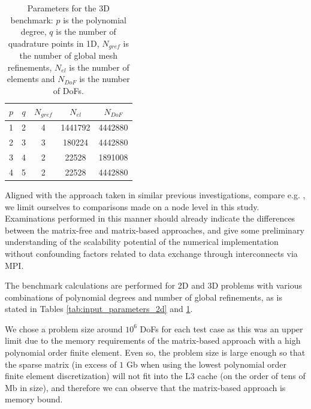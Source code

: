 \documentclass[times,doublespace]{nmeauth}
\newcommand{\changeDD}[1]{#1}
\newcommand{\changeJP}[1]{#1}
\begin{document}
\begin{table}
  \centering
  \begin{tabular}{ccccc}
  \hline
    $p$ & $q$ & $N_{gref}$ & $N_{el}$ & $N_{DoF}$ \\
  \hline
    1 & 2 & 4 & 1441792 & 4442880 \\
    2 & 3 & 3 & 180224 & 4442880 \\
    3 & 4 & 2 & 22528 & 1891008 \\
    4 & 5 & 2 & 22528 & 4442880 \\
  \hline
  \end{tabular}
  \caption{Parameters for the 3D benchmark: $p$ is the polynomial degree,
  $q$ is the number of quadrature points in 1D, $N_{gref}$ is the number of global mesh refinements, $N_{el}$ is the number of elements and $N_{DoF}$ is the number of DoFs.
  }
  \label{tab:input_parameters_3d}
\end{table}

\changeJP{%
Aligned with the approach taken in similar previous investigations, compare e.g. \cite{kronbichler2017fast},
we limit ourselves to comparisons made on a node level in this study.
Examinations performed in this manner should already indicate the differences between the matrix-free and matrix-based approaches, and give some preliminary understanding of the scalability potential of the numerical implementation without confounding factors related to data exchange through interconnects via MPI.
}
The benchmark calculations are performed for 2D and 3D problems with various combinations of polynomial degrees and number of global refinements, as is stated in Tables \ref{tab:input_parameters_2d} and \ref{tab:input_parameters_3d}.
\changeDD{
We chose a problem size around $10^6$ DoFs for each test case as this was an upper limit due to the memory requirements of the matrix-based approach \changeJP{with a high polynomial order finite element}.
\changeJP{Even so, the problem size is large enough so that the sparse matrix (in excess of $1$ Gb when using the lowest polynomial order finite element discretization) will not fit into the L3 cache (on the order of tens of Mb in size), and therefore we can observe that the matrix-based approach is memory bound}.
}
\end{document}

